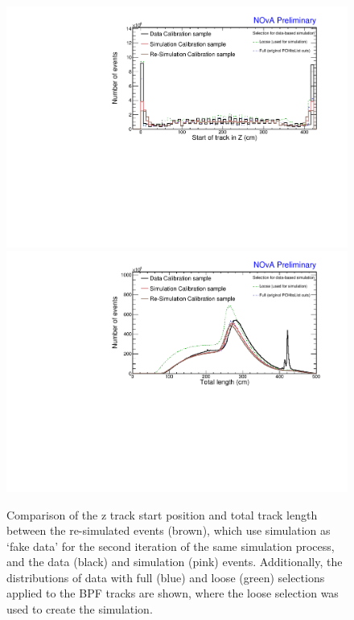 \begin{figure}[!ht]
\includegraphics[width=\textwidth]{Plots/TBCalibration/DBSim_SimVersionComparison_StartZ.pdf}
\includegraphics[width=\textwidth]{Plots/TBCalibration/DBSim_SimVersionComparison_TotLength.pdf}
\caption[Comparison of simulation to a re-simulation validation sample]{Comparison of the z track start position and total track length between the re-simulated events (brown), which use simulation as `fake data' for the second iteration of the same simulation process, and the data (black) and simulation (pink) events. Additionally, the distributions of data with full (blue) and loose (green) selections applied to the \acrshort{BPF} tracks are shown, where the loose selection was used to create the simulation.}
\label{fig:DataBasedSimSimVersionComparison}
\end{figure}

